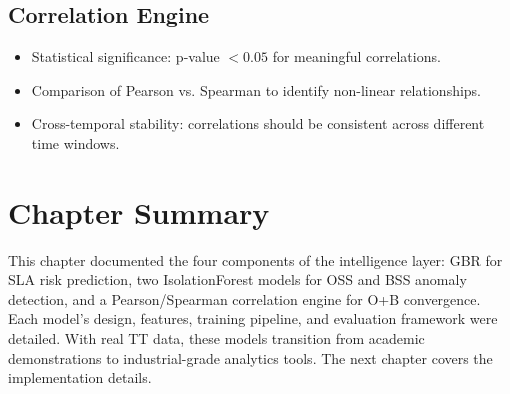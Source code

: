 \subsection{Correlation Engine}

\begin{itemize}
  \item Statistical significance: p-value $< 0.05$ for meaningful correlations.
  \item Comparison of Pearson vs. Spearman to identify non-linear relationships.
  \item Cross-temporal stability: correlations should be consistent across different time windows.
\end{itemize}

\section{Chapter Summary}

This chapter documented the four components of the intelligence layer: GBR for SLA risk prediction, two IsolationForest models for OSS and BSS anomaly detection, and a Pearson/Spearman correlation engine for O+B convergence. Each model's design, features, training pipeline, and evaluation framework were detailed. With real TT data, these models transition from academic demonstrations to industrial-grade analytics tools. The next chapter covers the implementation details.
